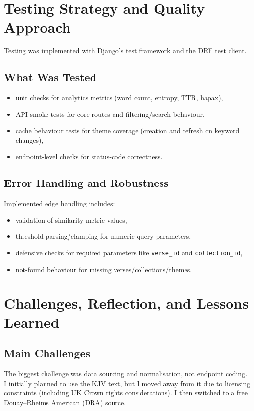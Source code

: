 \documentclass[11pt,a4paper]{article}
\begin{document}
\section{Testing Strategy and Quality Approach}
Testing was implemented with Django's test framework and the DRF test client.

\subsection{What Was Tested}
\begin{itemize}[leftmargin=*]
	\item unit checks for analytics metrics (word count, entropy, TTR, hapax),
	\item API smoke tests for core routes and filtering/search behaviour,
	\item cache behaviour tests for theme coverage (creation and refresh on keyword changes),
	\item endpoint-level checks for status-code correctness.
\end{itemize}

\subsection{Error Handling and Robustness}
Implemented edge handling includes:
\begin{itemize}[leftmargin=*]
	\item validation of similarity metric values,
	\item threshold parsing/clamping for numeric query parameters,
	\item defensive checks for required parameters like \texttt{verse\_id} and \texttt{collection\_id},
	\item not-found behaviour for missing verses/collections/themes.
\end{itemize}

\section{Challenges, Reflection, and Lessons Learned}
\subsection{Main Challenges}
The biggest challenge was data sourcing and normalisation, not endpoint coding. I initially planned to use the KJV text, but I moved away from it due to licensing constraints (including UK Crown rights considerations). I then switched to a free Douay--Rheims American (DRA) source.
\end{document}
